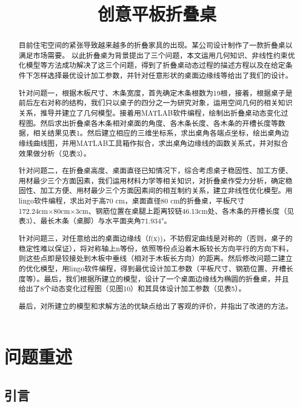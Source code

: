 \documentclass[bwprint]{cumcmthesis}
\title{创意平板折叠桌}
\begin{document}
 \maketitle
 \begin{abstract}
 目前住宅空间的紧张导致越来越多的折叠家具的出现。某公司设计制作了一款折叠桌以满足市场需要。
 以此折叠桌为背景提出了三个问题，本文运用几何知识、非线性约束优化模型等方法成功解决了这三个问题，得到了折叠桌动态过程的描述方程以及在给定条件下怎样选择最优设计加工参数，并针对任意形状的桌面边缘线等给出了我们的设计。


针对问题一，根据木板尺寸、木条宽度，首先确定木条根数为19根，接着，根据桌子是前后左右对称的结构，我们只以桌子的四分之一为研究对象，运用空间几何的相关知识关系，推导并建立了几何模型。接着用MATLAB软件编程，绘制出折叠桌动态变化过程图。然后求出折叠桌各木条相对桌面的角度、各木条长度、各木条的开槽长度等数据，相关结果见表1。然后建立相应的三维坐标系，求出桌角各端点坐标，绘出桌角边缘线曲线图，并用MATLAB工具箱作拟合，求出桌角边缘线的函数关系式，并对拟合效果做分析（见表3）。


针对问题二，在折叠桌高度、桌面直径已知情况下，综合考虑桌子稳固性、加工方便、用材最少三个方面因素，我们运用材料力学等相关知识，对折叠桌作受力分析，确定稳固性、加工方便、用材最少三个方面因素间的相互制约关系，建立非线性优化模型。用lingo软件编程，求出对于高70 cm，桌面直径80 cm的折叠桌，平板尺寸172.24cm×80cm×3cm、钢筋位置在桌腿上距离铰链46.13cm处、各木条的开槽长度（见表3）、最长木条（桌脚）与水平面夹角71.934°。

针对问题三，对任意给出的桌面边缘线（f(x))，不妨假定曲线是对称的（否则，桌子的稳定性难以保证），将对称轴上n等份，依照等份点沿着木板较长方向平行的方向下料，则这些点即是铰接处到木板中垂线（相对于木板长方向）的距离。然后修改问题二建立的优化模型，用lingo软件编程，得到最优设计加工参数（平板尺寸、钢筋位置、开槽长度等）。最后，我们根据所建立的模型，设计了一个桌面边缘线为椭圆的折叠桌，并且给出了8个动态变化过程图（见图10）和其具体设计加工参数（见表5）。

最后，对所建立的模型和求解方法的优缺点给出了客观的评价，并指出了改进的方法。

\end{abstract}

\section{问题重述}

\subsection{引言}
\end{document}
